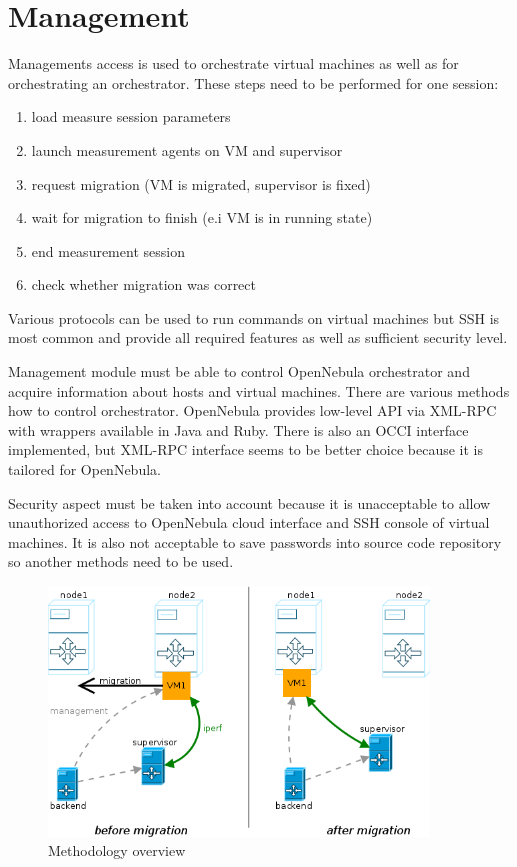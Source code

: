 \section{Management}
Managements access is used to orchestrate virtual machines as well as for orchestrating an orchestrator. These steps need to be performed for one session: 
\begin{enumerate}
	\item load measure session parameters
	\item launch measurement agents on \Ac{VM} and supervisor
	\item request migration (\Ac{VM} is migrated, supervisor is fixed)
	\item wait for migration to finish (e.i \Ac{VM} is in running state)
	\item end measurement session
	\item check whether migration was correct
\end{enumerate}

Various protocols can be used to run commands on virtual machines but \Ac{SSH} is most common and provide all required features as well as sufficient security level. 

Management module must be able to control OpenNebula orchestrator and acquire information about hosts and virtual machines. There are various methods how to control orchestrator. OpenNebula provides low-level \Ac{API} via \Ac{XML}-\Ac{RPC} with wrappers available in Java and Ruby. There is also an \Ac{OCCI} interface implemented, but \Ac{XML}-\Ac{RPC} interface seems to be better choice because it is tailored for OpenNebula.

Security aspect must be taken into account because it is unacceptable to allow unauthorized access to OpenNebula cloud interface and \Ac{SSH} console of virtual machines. It is also not acceptable to save passwords into source code repository so another methods need to be used. 

\begin{figure}[htb]
	\begin{center}
	\includegraphics[width=0.9\textwidth]{methodology.png}
	\end{center}
	\caption{Methodology overview}
	\label{img:methodology}
\end{figure}


